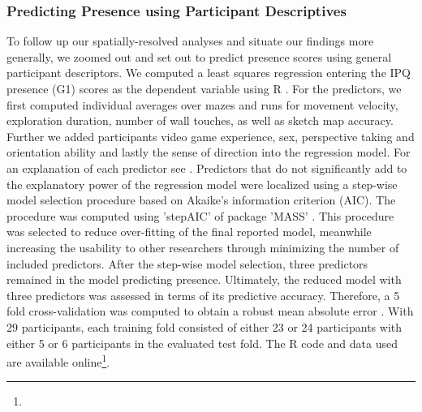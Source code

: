 \subsubsection{Predicting Presence using Participant Descriptives} 
To follow up our spatially-resolved analyses and situate our findings more generally, we zoomed out and set out to predict presence scores using general participant descriptors. We computed a least squares regression entering the IPQ presence (G1) scores as the dependent variable using R \cite{RFoundationforStatisticalComputing.2018}. For the predictors, we first computed individual averages over mazes and runs for movement velocity, exploration duration, number of wall touches, as well as sketch map accuracy. Further we added participants video game experience, sex, perspective taking and orientation ability and lastly the sense of direction into the regression model. For an explanation of each predictor see \cite{}. Predictors that do not significantly add to the explanatory power of the regression model were localized using a step-wise model selection procedure based on Akaike's information criterion (AIC). The procedure was computed using 'stepAIC' of package 'MASS' \cite{Akaike1998a, Venables2002}. This procedure was selected to reduce over-fitting of the final reported model, meanwhile increasing the usability to other researchers through minimizing the number of included predictors. After the step-wise model selection, three predictors remained in the model predicting presence. Ultimately, the reduced model with three predictors was assessed in terms of its predictive accuracy. Therefore, a 5 fold cross-validation was computed to obtain a robust mean absolute error \cite{Mosteller1968, Furnkranz2011}. With 29 participants, each training fold consisted of either 23 or 24 participants with either 5 or 6 participants in the evaluated test fold. The R code and data used are available online\footnote{}.


